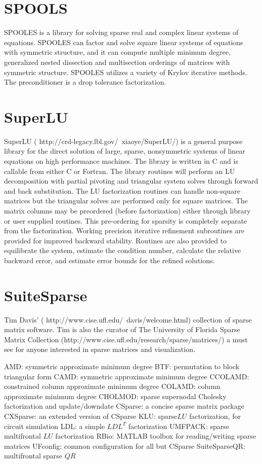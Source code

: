 \section*{SPOOLS}
SPOOLES is a library for solving sparse real and complex linear systems of equations. SPOOLES can factor and solve square linear systems of equations with symmetric structure, and it can compute multiple minimum degree, generalized nested dissection and multisection orderings of matrices with symmetric structure.  SPOOLES utilizes a variety of Krylov iterative methods. The preconditioner is a drop tolerance factorization.

\section*{SuperLU}
SuperLU ( http://crd-legacy.lbl.gov/~xiaoye/SuperLU/) is a general purpose library for the direct solution of large, sparse, nonsymmetric systems of linear equations on high performance machines. The library is written in C and is callable from either C or Fortran. The library routines will perform an LU decomposition with partial pivoting and triangular system solves through forward and back substitution. The LU factorization routines can handle non-square matrices but the triangular solves are performed only for square matrices. The matrix columns may be preordered (before factorization) either through library or user supplied routines. This pre-ordering for sparsity is completely separate from the factorization. Working precision iterative refinement subroutines are provided for improved backward stability. Routines are also provided to equilibrate the system, estimate the condition number, calculate the relative backward error, and estimate error bounds for the refined solutions.

\section*{SuiteSparse}
Tim Davis' ( http://www.cise.ufl.edu/~davis/welcome.html) collection of sparse matrix software.  Tim is also the curator of The University of Florida Sparse Matrix Collection (http://www.cise.ufl.edu/research/sparse/matrices/) a must see for anyone interested in sparse
matrices and visualization.

AMD: symmetric approximate minimum degree
BTF: permutation to block triangular form
CAMD: symmetric approximate minimum degree
CCOLAMD: constrained column approximate minimum degree
COLAMD: column approximate minimum degree
CHOLMOD: sparse supernodal Cholesky factorization and update/downdate
CSparse: a concise sparse matrix package
CXSparse: an extended version of CSparse
KLU: sparse$ LU$ factorization, for circuit simulation
LDL: a simple $LDL^T$ factorization
UMFPACK: sparse multifrontal $LU$ factorization
RBio: MATLAB toolbox for reading/writing sparse matrices
UFconfig: common configuration for all but CSparse
SuiteSparseQR: multifrontal sparse $QR$

